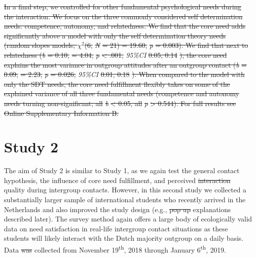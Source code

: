 \documentclass[man, 12pt, a4paper, mask]{apa7} %
\theoremstyle{break}
\theoremstyle{plain}
\providecommand{\DIFaddtex}[1]{{\protect\color{blue}\uwave{#1}}} %
\providecommand{\DIFdeltex}[1]{{\protect\color{red}\sout{#1}}}                      %
\providecommand{\DIFaddbegin}{} %
\providecommand{\DIFaddend}{} %
\providecommand{\DIFdelbegin}{} %
\providecommand{\DIFdelend}{} %
\providecommand{\DIFadd}[1]{\texorpdfstring{\DIFaddtex{#1}}{#1}} %
\providecommand{\DIFdel}[1]{\texorpdfstring{\DIFdeltex{#1}}{}} %
\newcommand{\DIFscaledelfig}{0.5}
\newlength{\DIFdelgraphicswidth} %
\newlength{\DIFdelgraphicsheight} %
\newcommand{\DIFaddincludegraphics}[2][]{{\color{blue}\fbox{\DIFOincludegraphics[#1]{#2}}}} %
\newcommand{\DIFdelincludegraphics}[2][]{%
\sbox{\DIFdelgraphicsbox}{\DIFOincludegraphics[#1]{#2}}%
\settoboxwidth{\DIFdelgraphicswidth}{\DIFdelgraphicsbox} %
\settoboxtotalheight{\DIFdelgraphicsheight}{\DIFdelgraphicsbox} %
\scalebox{\DIFscaledelfig}{%
\parbox[b]{\DIFdelgraphicswidth}{\usebox{\DIFdelgraphicsbox}\\[-\baselineskip] \rule{\DIFdelgraphicswidth}{0em}}\llap{\resizebox{\DIFdelgraphicswidth}{\DIFdelgraphicsheight}{%
\setlength{\unitlength}{\DIFdelgraphicswidth}%
\begin{picture}(1,1)%
\thicklines\linethickness{2pt} %
{\color[rgb]{1,0,0}\put(0,0){\framebox(1,1){}}}%
{\color[rgb]{1,0,0}\put(0,0){\line( 1,1){1}}}%
{\color[rgb]{1,0,0}\put(0,1){\line(1,-1){1}}}%
\end{picture}%
}\hspace*{3pt}}} %
} %
\DeclareRobustCommand{\DIFaddbegin}{\DIFOaddbegin \let\includegraphics\DIFaddincludegraphics} %
\DeclareRobustCommand{\DIFaddend}{\DIFOaddend \let\includegraphics\DIFOincludegraphics} %
\DeclareRobustCommand{\DIFdelbegin}{\DIFOdelbegin \let\includegraphics\DIFdelincludegraphics} %
\DeclareRobustCommand{\DIFdelend}{\DIFOaddend \let\includegraphics\DIFOincludegraphics} %
\begin{document}
\DIFdel{In a final step, we controlled for other fundamental psychological needs
during the interaction. We focus on the three commonly considered self
determination needs: competence, autonomy, and relatedness. We find that
the core need adds significantly above a model with only the self
determination theory needs (random slopes models; \(\chi^2\)(6,
}\textit{\DIFdel{N}} %
\DIFdel{= 21) = 19.60, }\textit{\DIFdel{p}} %
\DIFdel{= 0.003). We find that next to
relatedness (}\textit{\DIFdel{b}} %
\DIFdel{= 0.10, }%
\DIFdel{= 4.04, }\textit{\DIFdel{p}}
\DIFdel{\textless{} .001, }\textit{95\%CI}{%
}%
\DIFdel{0.05, 0.14}%
\DIFdel{), the core need
explains the most variance in outgroup attitudes after an outgroup
contact (}\textit{\DIFdel{b}} %
\DIFdel{= 0.09, }%
\DIFdel{= 2.23, }\textit{\DIFdel{p}} %
\DIFdel{= 0.026,
}\textit{95\%CI}{%
}%
\DIFdel{0.01, 0.18}%
\DIFdel{). When compared to the model with only
the SDT needs, the core need fulfillment flexibly takes on some of the
explained variance of all three fundamental needs (competence and
autonomy needs turning non-significant; all }\textit{\DIFdel{b}} %
\DIFdel{\textless{} 0.05,
all }\textit{\DIFdel{p}} %
\DIFdel{\textgreater{} 0.544). For full results see Online
Supplementary Information B.
}%

\DIFdelend \section{Study 2}

The aim of Study 2 is similar to Study 1, as we again test the general
contact hypothesis, the influence of core need fulfillment, and
perceived \DIFdelbegin \DIFdel{interaction }\DIFdelend \DIFaddbegin \DIFadd{contact }\DIFaddend quality during intergroup contacts. However, in this
second study we collected a substantially larger sample of international
students who recently arrived in the Netherlands and also improved the
study design (e.g., \DIFdelbegin \DIFdel{pop up }\DIFdelend \DIFaddbegin \DIFadd{pop-up }\DIFaddend explanations described later). The survey
method again offers a large body of ecologically valid data on need
satisfaction in real-life intergroup contact situations as these
students will likely interact with the Dutch majority outgroup on a
daily basis. Data \DIFdelbegin \DIFdel{was }\DIFdelend \DIFaddbegin \DIFadd{were }\DIFaddend collected from November 19\textsuperscript{th},
2018 through January 6\textsuperscript{th}, 2019. \DIFdelbegin %
\end{document}
